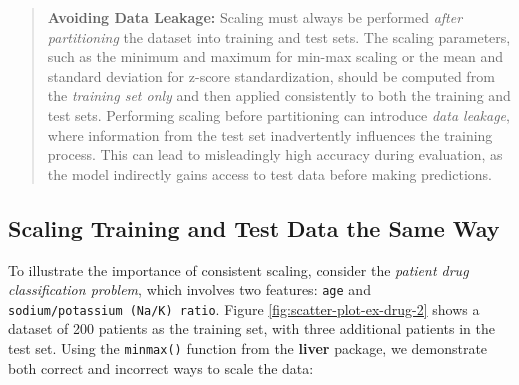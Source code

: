 \documentclass[
  11pt,
]{book}
\renewenvironment{quote}{\begin{quotation}}{\end{quotation}}
\theoremstyle{definition}
\theoremstyle{definition}
\theoremstyle{definition}
\theoremstyle{definition}
\theoremstyle{remark}
\begin{document}
\begin{quote}
\textbf{Avoiding Data Leakage:}
Scaling must always be performed \emph{after partitioning} the dataset into training and test sets. The scaling parameters, such as the minimum and maximum for min-max scaling or the mean and standard deviation for z-score standardization, should be computed from the \emph{training set only} and then applied consistently to both the training and test sets. Performing scaling before partitioning can introduce \emph{data leakage}, where information from the test set inadvertently influences the training process. This can lead to misleadingly high accuracy during evaluation, as the model indirectly gains access to test data before making predictions.
\end{quote}

\subsection{Scaling Training and Test Data the Same Way}\label{scaling-training-and-test-data-the-same-way}

To illustrate the importance of consistent scaling, consider the \emph{patient drug classification problem}, which involves two features: \texttt{age} and \texttt{sodium/potassium\ (Na/K)\ ratio}. Figure \ref{fig:scatter-plot-ex-drug-2} shows a dataset of 200 patients as the training set, with three additional patients in the test set. Using the \texttt{minmax()} function from the \textbf{liver} package, we demonstrate both correct and incorrect ways to scale the data:
\end{document}
